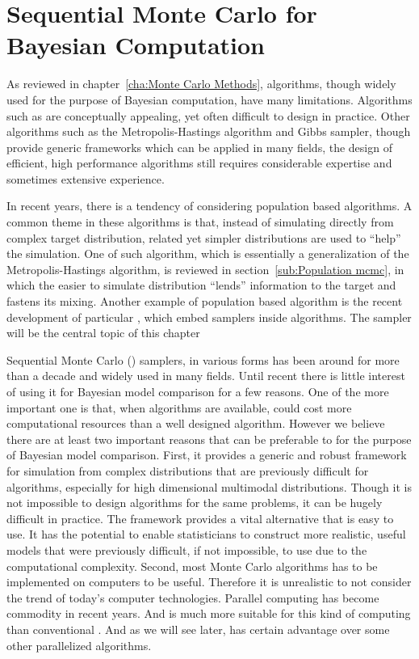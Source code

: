 \chapter{Sequential Monte Carlo for Bayesian Computation}
\label{cha:Sequential Monte Carlo for Bayesian Computation}

As reviewed in chapter~\ref{cha:Monte Carlo Methods}, \mcmc algorithms, though
widely used for the purpose of Bayesian computation, have many limitations.
Algorithms such as \rjmcmc are conceptually appealing, yet often difficult to
design in practice. Other algorithms such as the Metropolis-Hastings algorithm
and Gibbs sampler, though provide generic frameworks which can be applied in
many fields, the design of efficient, high performance algorithms still
requires considerable expertise and sometimes extensive experience.

In recent years, there is a tendency of considering population based
algorithms. A common theme in these algorithms is that, instead of simulating
directly from complex target distribution, related yet simpler distributions
are used to ``help'' the simulation. One of such algorithm, which is
essentially a generalization of the Metropolis-Hastings algorithm, \pmcmc is
reviewed in section~\ref{sub:Population mcmc}, in which the easier to simulate
distribution ``lends'' information to the target and fastens its mixing.
Another example of population based algorithm is the recent development of
particular \mcmc \cite{Andrieu:2010gc}, which embed \smc samplers inside \mcmc
algorithms. The \smc sampler will be the central topic of this chapter

Sequential Monte Carlo (\smc) samplers, in various forms has been around for
more than a decade and widely used in many fields. Until recent there is
little interest of using it for Bayesian model comparison for a few reasons.
One of the more important one is that, when \mcmc algorithms are available,
\smc could cost more computational resources than a well designed \mcmc
algorithm. However we believe there are at least two important reasons that
\smc can be preferable to \mcmc for the purpose of Bayesian model comparison.
First, it provides a generic and robust framework for simulation from complex
distributions that are previously difficult for \mcmc algorithms, especially
for high dimensional multimodal distributions. Though it is not impossible to
design \mcmc algorithms for the same problems, it can be hugely difficult in
practice. The \smc framework provides a vital alternative that is easy to use.
It has the potential to enable statisticians to construct more realistic,
useful models that were previously difficult, if not impossible, to use due to
the computational complexity. Second, most Monte Carlo algorithms has to be
implemented on computers to be useful. Therefore it is unrealistic to not
consider the trend of today's computer technologies. Parallel computing has
become commodity in recent years. And \smc is much more suitable for this kind
of computing than conventional \mcmc. And as we will see later, \smc has
certain advantage over some other parallelized algorithms.

